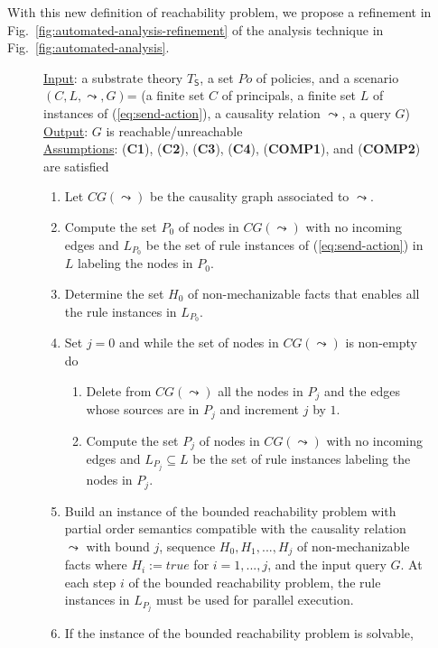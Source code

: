\documentclass[conference]{llncs}
\begin{document}
{With this new definition of reachability problem, we propose a
refinement in Fig.~\ref{fig:automated-analysis-refinement} of the
analysis technique in Fig.~\ref{fig:automated-analysis}.
\begin{figure}[t]
\centering
\begin{minipage}{\textwidth}
\underline{\textsf{Input}}: a substrate theory $T_{\mathsf{S}}$, a set
$\mathit{Po}$ of policies, and a scenario
 $(C, L, \leadsto, G)$= (a finite set $C$ of
principals, a finite set $L$ of instances of (\ref{eq:send-action}), a causality relation $\leadsto$, a query $G$)\\
\underline{\textsf{Output}}: $G$ is reachable/unreachable\\
\underline{\textsf{Assumptions}}:   (\textbf{C1}), (\textbf{C2}),
(\textbf{C3}), (\textbf{C4}), (\textbf{COMP1}), and (\textbf{COMP2}) are satisfied
\begin{enumerate}
\item Let $CG(\leadsto)$ be the causality graph associated to
  $\leadsto$.
\item Compute the set $P_0$ of nodes in $CG(\leadsto)$ with no
  incoming edges and $L_{P_0}$ be the set of rule instances of
  (\ref{eq:send-action}) in $L$ labeling the nodes in $P_0$.
\item Determine the set $H_0$ of non-mechanizable facts that enables
  all the rule instances in $L_{P_0}$.
\item Set $j=0$ and while the set of nodes in $CG(\leadsto)$ is
  non-empty do
  \begin{enumerate}
    \item Delete from $CG(\leadsto)$ all the nodes in $P_j$ and the
      edges whose sources are in $P_j$ and increment $j$ by $1$.
    \item Compute the set $P_j$ of nodes in $CG(\leadsto)$ with no
      incoming edges and $L_{P_j}\subseteq L$ be the set of rule
      instances labeling the nodes in $P_j$.  
  \end{enumerate}
\item Build an instance of the bounded reachability problem with
  partial order semantics compatible with the causality relation
  $\leadsto$ with bound $j$, sequence $H_0, H_1, ..., H_{j}$ of
  non-mechanizable facts where $H_i:=\mathit{true}$ for $i=1, ...,
  j$, and the input query $G$.  At each step $i$ of the bounded
  reachability problem, the rule instances in $L_{P_j}$ must be used
  for parallel execution.
\item If the instance of the bounded reachability problem is solvable,

\end{enumerate}
\end{minipage}
\end{figure}}
\end{document}
